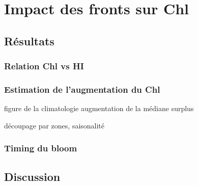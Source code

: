 
\chapter{Impact des fronts sur Chl}

\section{Résultats}

\subsection{Relation Chl vs HI}

\subsection{Estimation de l'augmentation du Chl}

figure de la climatologie
augmentation de la médiane
surplus

découpage par zones, saisonalité

\subsection{Timing du bloom}

\section{Discussion}
